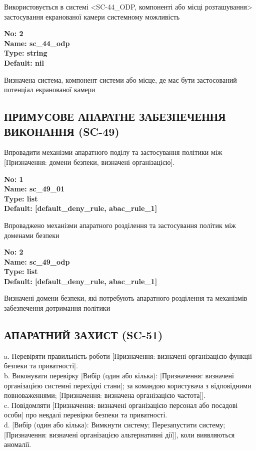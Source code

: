 \documentclass{article}
\begin{document}
{\footnotesize Використовується в системі <SC-44\_ODP, компоненті або місці розташування> застосування екранованої камери системному можливість}


{\footnotesize\bfseries
No: 2\\
Name: sc\_44\_odp\\
Type: string\\
Default: nil
}

{\footnotesize Визначена система, компонент системи або місце, де має бути застосований потенціал екранованої камери}




\subsection{ПРИМУСОВЕ АПАРАТНЕ ЗАБЕЗПЕЧЕННЯ ВИКОНАННЯ (SC-49)}
Впровадити механізми апаратного поділу та застосування політики між [Призначення: домени безпеки, визначені організацією].

\vspace{10pt}
{\footnotesize\bfseries
No: 1\\
Name: sc\_49\_01\\
Type: list\\
Default: [\textquotedbl{}default\_deny\_rule\textquotedbl{}, \textquotedbl{}abac\_rule\_1\textquotedbl{}]
}

{\footnotesize Впроваджено механізми апаратного розділення та застосування політик між доменами безпеки}


{\footnotesize\bfseries
No: 2\\
Name: sc\_49\_odp\\
Type: list\\
Default: [\textquotedbl{}default\_deny\_rule\textquotedbl{}, \textquotedbl{}abac\_rule\_1\textquotedbl{}]
}

{\footnotesize Визначені домени безпеки, які потребують апаратного розділення та механізмів забезпечення дотримання політики}




\subsection{АПАРАТНИЙ ЗАХИСТ (SC-51)}
a. Перевіряти правильність роботи [Призначення: визначені організацією функції безпеки та приватності].\\ 
b. Виконувати перевірку [Вибір (один або кілька): [Призначення: визначені організацією системні перехідні стани]; за командою користувача з відповідними повноваженнями; [Призначення: визначена організацією частота]].\\ 
c. Повідомляти [Призначення: визначені організацією персонал або посадові особи] про невдалі перевірки безпеки та приватності.\\ 
d. [Вибір (один або кілька): Вимкнути систему; Перезапустити систему; [Призначення: визначені організацією альтернативні дії]], коли виявляються аномалії.
\end{document}
